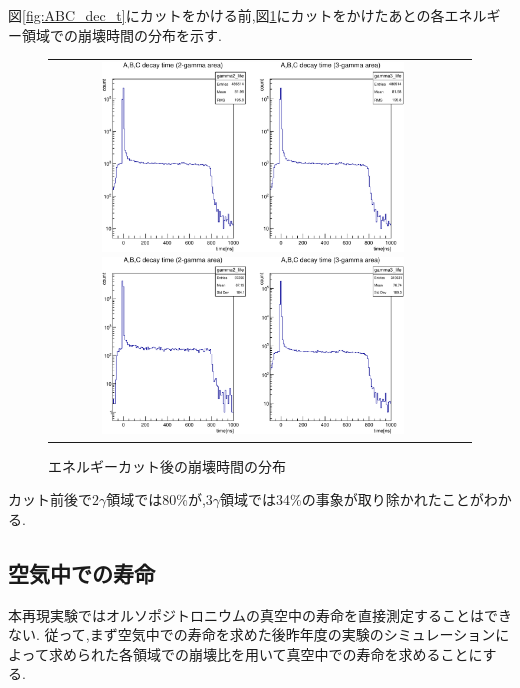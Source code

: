 図\ref{fig:ABC_dec_t}にカットをかける前,図\ref{fig:ABC_dec_t_cut}にカットをかけたあとの各エネルギー領域での崩壊時間の分布を示す.
\begin{figure}[H]
	\begin{tabular}{cc}
		\begin{minipage}{0.5\hsize}
			\centering
				\includegraphics[width=80mm]{fig/isb/abc_dec_t_E.pdf}
				\caption{エネルギーカット前の崩壊時間の分布}
				\label{fig:ABC_dec_t}
		\end{minipage}
		\begin{minipage}{0.5\hsize}
			\centering
				\includegraphics[width=80mm]{fig/isb/abc_dec_t_E_cut.pdf}
				\caption{エネルギーカット後の崩壊時間の分布}
				\label{fig:ABC_dec_t_cut}
		\end{minipage}
	\end{tabular}
\end{figure}
カット前後で$2\gamma$領域では80\%が,$3\gamma$領域では34\%の事象が取り除かれたことがわかる.


\subsection{空気中での寿命}
本再現実験ではオルソポジトロニウムの真空中の寿命を直接測定することはできない.
従って,まず空気中での寿命を求めた後昨年度の実験のシミュレーションによって求められた各領域での崩壊比を用いて真空中での寿命を求めることにする.

